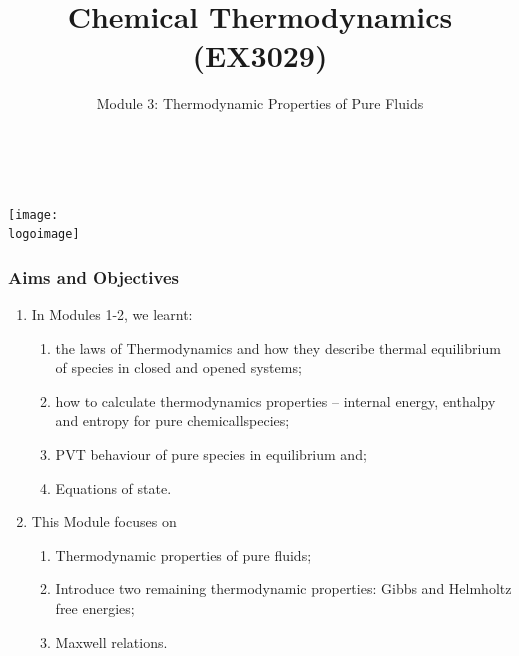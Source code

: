 \documentclass[10pt,compress,handout,ignorenonframetext,unknownkeysallowed]{beamer}
\institute{School of Engineering}
\title{Chemical Thermodynamics (EX3029)}
\subtitle{Module 3: Thermodynamic Properties of Pure Fluids}
\date[ ]{ }
\author[\shortname]{%
  \fullname\\\ttfamily{\emailaddress}
}
\newcommand{\logoimage}{../../FigBanner/UoAHorizBanner}
\begin{document}
\begin{frame}
  \titlepage
  \vfill%
  \begin{center}
    \texttt{[image: \\logoimage]}
  \end{center}
\end{frame}






\begin{frame}
 \frametitle{Aims and Objectives}
   \begin{enumerate}
     \item<1-> In Modules 1-2, we learnt:
       \begin{enumerate}
         \item<1-> the laws of Thermodynamics and how they describe thermal equilibrium of species in closed and opened systems;
         \item<1-> how to calculate thermodynamics properties -- internal energy, enthalpy and entropy for pure chemicallspecies;
         \item<1-> PVT behaviour of pure species in equilibrium and;
         \item<1-> Equations of state.
       \end{enumerate} 
     \item<2-> This Module focuses on 
         \begin{enumerate}
           \item<2-> Thermodynamic properties of pure fluids;
           \item<2-> Introduce two remaining thermodynamic properties: Gibbs and Helmholtz free energies;
           \item<2-> Maxwell relations.
         \end{enumerate}
   \end{enumerate}

\end{frame}
\end{document}
